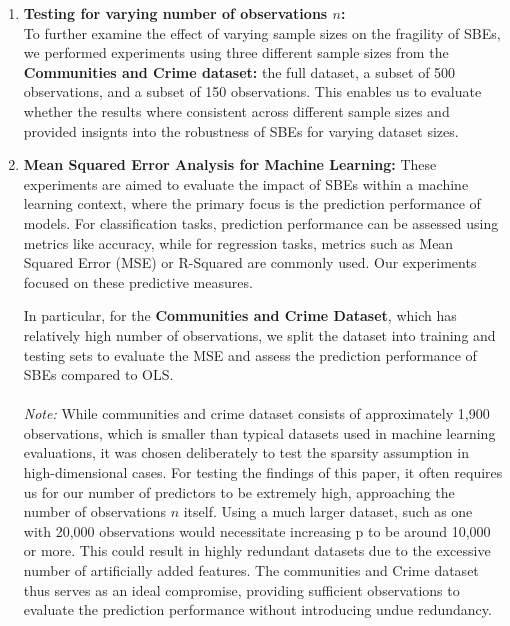 \begin{enumerate}
    \item \textbf{Testing for varying number of observations $n$:}\\
    To further examine the effect of varying sample sizes on the fragility of SBEs, we performed experiments using three different sample sizes from the \textbf{Communities and Crime dataset:} the full dataset, a subset of 500 observations, and a subset of 150 observations. This enables us to evaluate whether the results where consistent across different sample sizes and provided insignts into the robustness of SBEs for varying dataset sizes. 

    \item \textbf{Mean Squared Error Analysis for Machine Learning:}
    These experiments are aimed to evaluate the impact of SBEs within a machine learning context, where the primary focus is the prediction performance of models. For classification tasks, prediction performance can be assessed using metrics like accuracy, while for regression tasks, metrics such as Mean Squared Error (MSE) or R-Squared are commonly used. Our experiments focused on these predictive measures.
    
    In particular, for the \textbf{Communities and Crime Dataset}, which has relatively high number of observations, we split the dataset into training and testing sets to evaluate the MSE and assess the prediction performance of SBEs compared to OLS.\\
    \\
    \textit{Note:} While communities and crime dataset consists of approximately 1,900 observations, which is smaller than typical datasets used in machine learning evaluations, it was chosen deliberately to test the sparsity assumption in high-dimensional cases. For testing the findings of this paper, it often requires us for our number of predictors to be extremely high, approaching the number of observations $n$ itself. Using a much larger dataset, such as one with 20,000 observations would necessitate increasing p to be around 10,000 or more. This could result in highly redundant datasets due to the excessive number of artificially added features. The communities and Crime dataset thus serves as an ideal compromise, providing sufficient observations to evaluate the prediction performance without introducing undue redundancy.
        
\end{enumerate}
